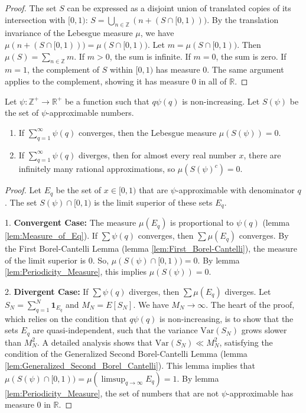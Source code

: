 \begin{proof}
    The set $S$ can be expressed as a disjoint union of translated copies of its intersection with $[0,1)$: $S = \bigcup_{n \in \mathbb{Z}} (n + (S \cap [0,1)))$. By the translation invariance of the Lebesgue measure $\mu$, we have $\mu(n + (S \cap [0,1))) = \mu(S \cap [0,1))$. Let $m = \mu(S \cap [0,1))$. Then $\mu(S) = \sum_{n \in \mathbb{Z}} m$. If $m>0$, the sum is infinite. If $m=0$, the sum is zero. If $m=1$, the complement of $S$ within $[0,1)$ has measure 0. The same argument applies to the complement, showing it has measure 0 in all of $\mathbb{R}$.
\end{proof}

\begin{theorem}
    \label{thm:Khinchin}
    Let $\psi: \mathbb{Z}^+ \to \mathbb{R}^+$ be a function such that $q\psi(q)$ is non-increasing. Let $S(\psi)$ be the set of $\psi$-approximable numbers.
    \begin{enumerate}
        \item If $\sum_{q=1}^{\infty} \psi(q)$ converges, then the Lebesgue measure $\mu(S(\psi)) = 0$.
        \item If $\sum_{q=1}^{\infty} \psi(q)$ diverges, then for almost every real number $x$, there are infinitely many rational approximations, so $\mu(S(\psi)^c) = 0$.
    \end{enumerate}
\end{theorem}

\begin{proof}

    Let $E_q$ be the set of $x \in [0,1)$ that are $\psi$-approximable with denominator $q$. The set $S(\psi) \cap [0,1)$ is the limit superior of these sets $E_q$.

    1.  \textbf{Convergent Case:} The measure $\mu(E_q)$ is proportional to $\psi(q)$ (lemma \ref{lem:Measure_of_Eq}). If $\sum \psi(q)$ converges, then $\sum \mu(E_q)$ converges. By the First Borel-Cantelli Lemma (lemma \ref{lem:First_Borel-Cantelli}), the measure of the limit superior is 0. So, $\mu(S(\psi) \cap [0,1)) = 0$. By lemma \ref{lem:Periodicity_Measure}, this implies $\mu(S(\psi))=0$.

    2.  \textbf{Divergent Case:} If $\sum \psi(q)$ diverges, then $\sum \mu(E_q)$ diverges. Let $S_N = \sum_{q=1}^N \mathbf{1}_{E_q}$ and $M_N = E[S_N]$. We have $M_N \to \infty$. The heart of the proof, which relies on the condition that $q\psi(q)$ is non-increasing, is to show that the sets $E_q$ are quasi-independent, such that the variance $\text{Var}(S_N)$ grows slower than $M_N^2$. A detailed analysis shows that $\text{Var}(S_N) \ll M_N^2$, satisfying the condition of the Generalized Second Borel-Cantelli Lemma (lemma \ref{lem:Generalized_Second_Borel_Cantelli}). This lemma implies that $\mu(S(\psi) \cap [0,1)) = \mu(\limsup_{q \to \infty} E_q) = 1$. By lemma \ref{lem:Periodicity_Measure}, the set of numbers that are not $\psi$-approximable has measure 0 in $\mathbb{R}$.
\end{proof}
